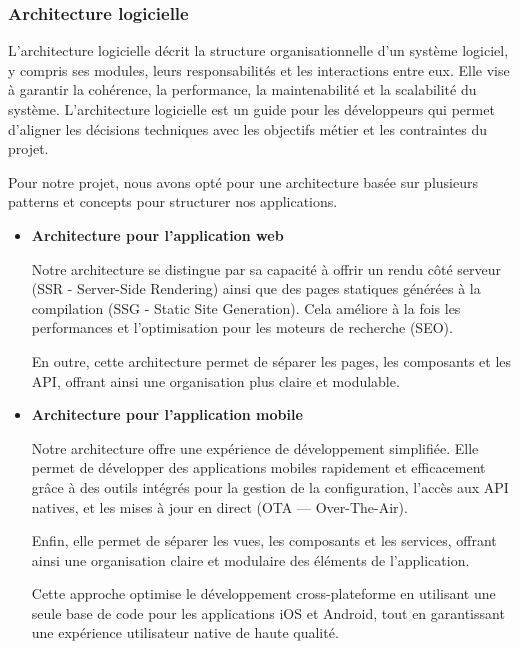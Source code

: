 \subsubsection{Architecture logicielle}
L’architecture logicielle décrit la structure organisationnelle d’un système
logiciel, y compris ses modules, leurs responsabilités et les interactions
entre eux. Elle vise à garantir la cohérence, la performance, la maintenabilité
et la scalabilité du système. L’architecture logicielle est un guide pour les
développeurs qui permet d’aligner les décisions techniques avec les objectifs
métier et les contraintes du projet.

Pour notre projet, nous avons opté pour une architecture basée sur plusieurs
patterns et concepts pour structurer nos applications.

\begin{itemize}
  \item \textbf{Architecture pour l'application web }

    Notre architecture se distingue par sa capacité à offrir un rendu côté
    serveur (SSR - Server-Side Rendering) ainsi que des pages statiques générées
    à la compilation (SSG - Static Site Generation). Cela améliore à la fois
    les performances et l’optimisation pour les moteurs de recherche (SEO).

    En outre, cette architecture permet de séparer les pages, les composants et
    les API, offrant ainsi une organisation plus claire et modulable.

  \item \textbf{Architecture pour l'application mobile}

    Notre architecture offre une expérience de développement simplifiée. Elle
    permet de développer des applications mobiles rapidement et efficacement grâce
    à des outils intégrés pour la gestion de la configuration, l’accès aux API
    natives, et les mises à jour en direct (OTA — Over-The-Air).

    Enfin, elle permet de séparer les vues, les composants et les services, offrant
    ainsi une organisation claire et modulaire des éléments de l’application.

    Cette approche optimise le développement cross-plateforme en utilisant une seule
    base de code pour les applications iOS et Android, tout en garantissant une
    expérience utilisateur native de haute qualité.
\end{itemize}



